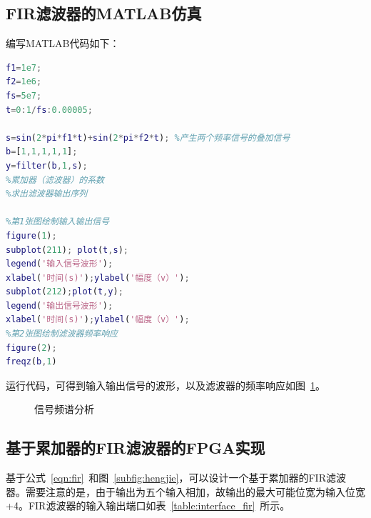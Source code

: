 \subsection{FIR滤波器的MATLAB仿真}
编写MATLAB代码如下：
\begin{lstlisting}[language=matlab]
f1=1e7;
f2=1e6;
fs=5e7;
t=0:1/fs:0.00005;

s=sin(2*pi*f1*t)+sin(2*pi*f2*t); %产生两个频率信号的叠加信号
b=[1,1,1,1,1];
y=filter(b,1,s);
%累加器（滤波器）的系数
%求出滤波器输出序列

%第1张图绘制输入输出信号
figure(1);
subplot(211); plot(t,s);
legend('输入信号波形');
xlabel('时间(s)');ylabel('幅度（v）');
subplot(212);plot(t,y);
legend('输出信号波形');
xlabel('时间(s)');ylabel('幅度（v）');
%第2张图绘制滤波器频率响应
figure(2);
freqz(b,1)
\end{lstlisting}
运行代码，可得到输入输出信号的波形，以及滤波器的频率响应如图~\ref{fig:exp4:matlab}。
\begin{figure}[htbp]
  \centering
  \hfill
  \caption{信号频谱分析}
  \label{fig:exp4:matlab}
\end{figure}
\subsection{基于累加器的FIR滤波器的FPGA实现}
基于公式~\ref{eqn:fir}~和图~\ref{subfig:hengjie}，可以设计一个基于累加器的FIR滤波器。需要注意的是，由于输出为五个输入相加，故输出的最大可能位宽为输入位宽+4。FIR滤波器的输入输出端口如表~\ref{table:interface_fir}~所示。

